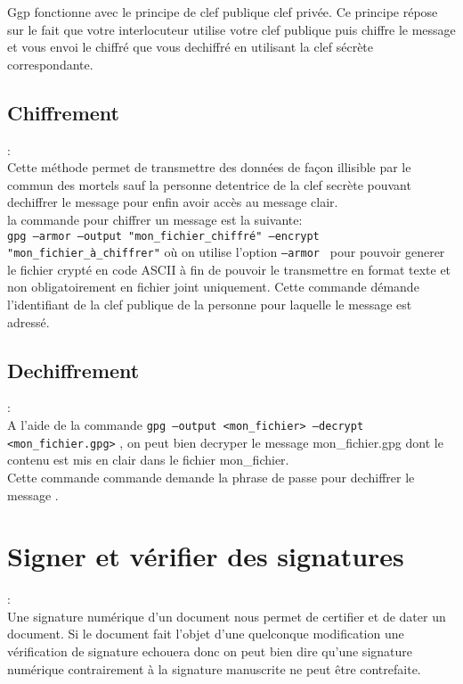 Ggp fonctionne avec le principe de clef publique clef privée. Ce principe répose sur le fait que votre interlocuteur
utilise votre clef publique puis chiffre le message et vous envoi le chiffré que vous dechiffré en utilisant 
la clef sécrète correspondante.


\subsection {Chiffrement}:\\
Cette méthode permet de transmettre des données de façon illisible par le commun des mortels sauf la personne detentrice de la clef 
secrète pouvant dechiffrer le message pour enfin avoir accès au message clair.\\

la commande pour chiffrer un message est la suivante:\\
\texttt{gpg --armor --output "mon\_fichier\_chiffré" --encrypt "mon\_fichier\_à\_chiffrer"}
où on utilise l'option \texttt{--armor } pour pouvoir generer le fichier crypté en code ASCII à fin de pouvoir le transmettre en 
format texte et non obligatoirement en fichier joint uniquement.
Cette commande démande l'identifiant de la clef publique de la personne pour laquelle le message est adressé.


\subsection {Dechiffrement}:\\
A l'aide de la commande \texttt{gpg --output <mon\_fichier> --decrypt <mon\_fichier.gpg>} , on peut bien decryper le message 
mon\_fichier.gpg dont le contenu est mis en clair dans le fichier  mon\_fichier.\\

Cette commande commande demande la phrase de passe pour dechiffrer le message .


\section {Signer et vérifier des signatures} :\\

Une signature numérique d'un document nous permet de certifier et de dater un document. Si le document fait l'objet d'une quelconque
modification une vérification de signature echouera donc on peut bien dire qu'une signature numérique contrairement à la signature 
manuscrite ne peut être contrefaite.


